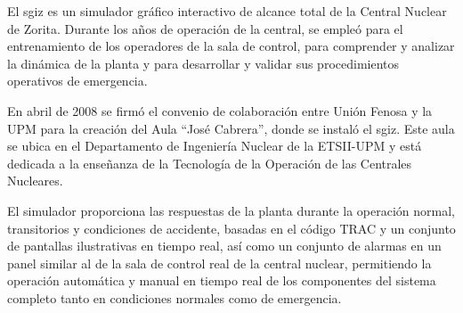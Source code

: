 El \acrshort{sgiz} es un simulador gráfico interactivo de alcance total de la Central Nuclear de Zorita. Durante los años de operación de la central, se empleó para el entrenamiento de los operadores de la sala de control, para comprender y analizar la dinámica de la planta y para desarrollar y validar sus procedimientos operativos de emergencia.

En abril de 2008 se firmó el convenio de colaboración entre Unión Fenosa y la UPM para la creación del Aula ``José Cabrera'', donde se instaló el \acrshort{sgiz}. Este aula se ubica en el Departamento de Ingeniería Nuclear de la ETSII-UPM y está dedicada a la enseñanza de la Tecnología de la Operación de las Centrales Nucleares.

El simulador proporciona las respuestas de la planta durante la operación normal, transitorios y condiciones de accidente, basadas en el código TRAC y un conjunto de pantallas ilustrativas en tiempo real, así como un conjunto de alarmas en un panel similar al de la sala de control real de la central nuclear, permitiendo la operación automática y manual en tiempo real de los componentes del sistema completo tanto en condiciones normales como de emergencia.